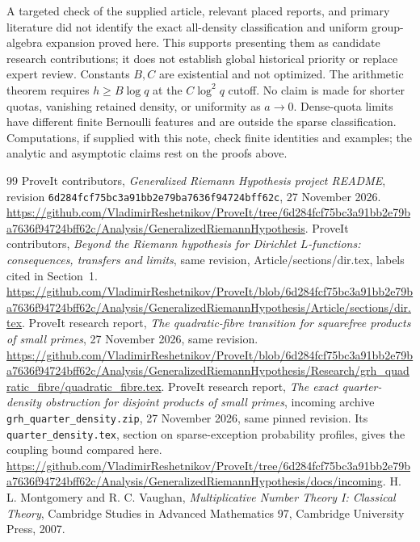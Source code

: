 \documentclass[11pt]{article}
\theoremstyle{remark}\newtheorem{remark}[theorem]{Remark}
\begin{document}
A targeted check of the supplied article, relevant placed reports, and primary literature did not identify the exact all-density classification and uniform group-algebra expansion proved here. This supports presenting them as candidate research contributions; it does not establish global historical priority or replace expert review. Constants $B,C$ are existential and not optimized. The arithmetic theorem requires $h\ge B\log q$ at the $C\log^2q$ cutoff. No claim is made for shorter quotas, vanishing retained density, or uniformity as $a\to0$. Dense-quota limits have different finite Bernoulli features and are outside the sparse classification. Computations, if supplied with this note, check finite identities and examples; the analytic and asymptotic claims rest on the proofs above.

\begingroup
\raggedright
\begin{thebibliography}{99}
 ProveIt contributors, \emph{Generalized Riemann Hypothesis project README}, revision \texttt{6d284fcf75bc3a91bb2e79ba7636f94724bff62c}, 27 November 2026. \url{https://github.com/VladimirReshetnikov/ProveIt/tree/6d284fcf75bc3a91bb2e79ba7636f94724bff62c/Analysis/GeneralizedRiemannHypothesis}.
 ProveIt contributors, \emph{Beyond the Riemann hypothesis for Dirichlet $L$-functions: consequences, transfers and limits}, same revision, Article/sections/dir.tex, labels cited in Section~1. \url{https://github.com/VladimirReshetnikov/ProveIt/blob/6d284fcf75bc3a91bb2e79ba7636f94724bff62c/Analysis/GeneralizedRiemannHypothesis/Article/sections/dir.tex}.
 ProveIt research report, \emph{The quadratic-fibre transition for squarefree products of small primes}, 27 November 2026, same revision. \url{https://github.com/VladimirReshetnikov/ProveIt/blob/6d284fcf75bc3a91bb2e79ba7636f94724bff62c/Analysis/GeneralizedRiemannHypothesis/Research/grh_quadratic_fibre/quadratic_fibre.tex}.
 ProveIt research report, \emph{The exact quarter-density obstruction for disjoint products of small primes}, incoming archive \texttt{grh\_quarter\_density.zip}, 27 November 2026, same pinned revision. Its \texttt{quarter\_density.tex}, section on sparse-exception probability profiles, gives the coupling bound compared here. \url{https://github.com/VladimirReshetnikov/ProveIt/tree/6d284fcf75bc3a91bb2e79ba7636f94724bff62c/Analysis/GeneralizedRiemannHypothesis/docs/incoming}.
 H. L. Montgomery and R. C. Vaughan, \emph{Multiplicative Number Theory I: Classical Theory}, Cambridge Studies in Advanced Mathematics 97, Cambridge University Press, 2007.

\end{thebibliography}
\end{document}
